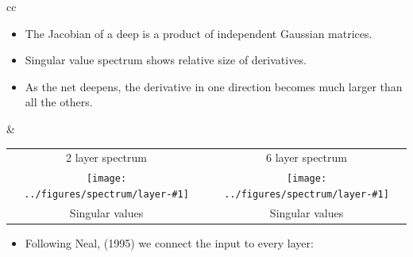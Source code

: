 \documentclass[portrait,a0b,final,a4resizeable]{include/a0poster}
\def\jointspacing{\vspace{0.3in}}
\newcommand{\spectrumpic}[1]{
\texttt{[image: ../figures/spectrum/layer-\#1]}}
\begin{document}
\begin{poster}
\begin{multicols}{2}
\jointspacing










\begin{tabular}{cc}
\begin{minipage}[c]{0.4\columnwidth}

\begin{itemize}
\item The Jacobian of a deep \gp{} is a product of independent Gaussian matrices.
\item Singular value spectrum shows relative size of derivatives.
\item As the net deepens, the derivative in one direction becomes much larger than all the others.
\end{itemize}

\end{minipage}
&
\begin{minipage}[c]{0.55\columnwidth}
\begin{centering}
\begin{tabular}{cc}
2 layer spectrum & 6 layer spectrum \\
\hspace{-0.16in} \spectrumpic{2} &
\hspace{-0.16in} \spectrumpic{6} \\
Singular values & Singular values  
\end{tabular}
\end{centering}
\end{minipage}
\end{tabular}






\jointspacing
\jointspacing

\centering
\begin{itemize}
	\item Following {\color{mydarkblue} Neal, (1995)} we connect the input to every layer:
\end{itemize}

\jointspacing


\jointspacing

\newcommand{\gpdrawboxcon}[1]{
\setlength\fboxsep{0pt}
\hspace{-0.4in} 
\fbox{
\texttt{[image: ../../figures/connected\_deep\_sample\_seed\_0/deep\_sample\_connected\_layer\#1]}
}}


\end{multicols}
\end{poster}
\end{document}
